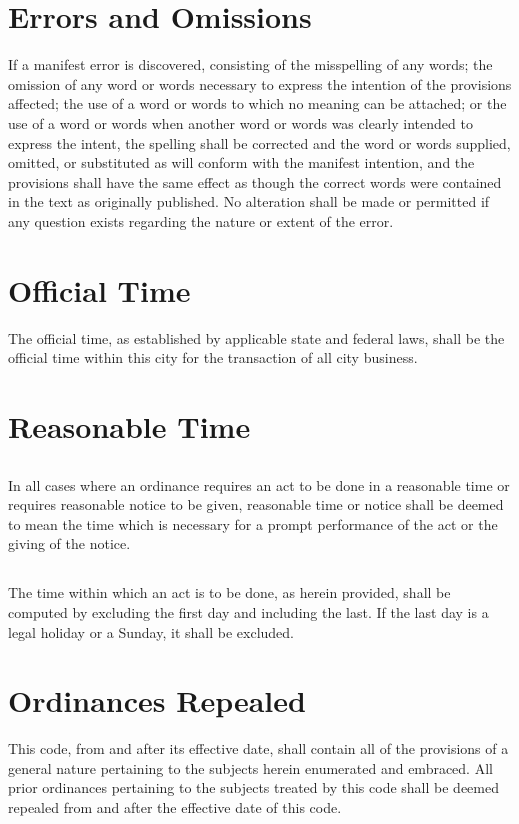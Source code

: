 \section{Errors and Omissions}
If a manifest error is discovered, consisting of the misspelling of any words; the omission of any word or words necessary to express the intention of the provisions affected; the use of a word or words to which no meaning can be attached; or the use of a word or words when another word or words was clearly intended to express the intent, the spelling shall be corrected and the word or words supplied, omitted, or substituted as will conform with the manifest intention, and the provisions shall have the same effect as though the correct words were contained in the text as originally published.  No alteration shall be made or permitted if any question exists regarding the nature or extent of the error.



\section{Official Time}
The official time, as established by applicable state and federal laws, shall be the official time within this city for the transaction of all city business.



\section{Reasonable Time}
\subsection{}
In all cases where an ordinance requires an act to be done in a reasonable time or requires reasonable notice to be given, reasonable time or notice shall be deemed to mean the time which is necessary for a prompt performance of the act or the giving of the notice.
\subsection{}
The time within which an act is to be done, as herein provided, shall be computed by excluding the first day and including the last.  If the last day is a legal holiday or a Sunday, it shall be excluded.



\section{Ordinances Repealed}
This code, from and after its effective date, shall contain all of the provisions of a general nature pertaining to the subjects herein enumerated and embraced.  All prior ordinances pertaining to the subjects treated by this code shall be deemed repealed from and after the effective date of this code.



